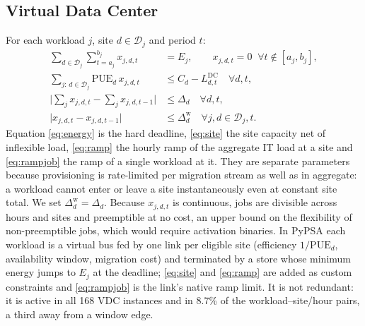 \documentclass[conference]{IEEEtran}
\begin{document}
\subsection{Virtual Data Center}
For each workload $j$, site $d\in\mathcal{D}_j$ and period $t$:
\begin{align}
\sum_{d\in\mathcal{D}_j} \sum_{t=a_j}^{b_j} x_{j,d,t} &= E_j, \qquad x_{j,d,t} = 0 \;\; \forall t \notin [a_j, b_j], \label{eq:energy}\\
\sum_{j:\, d\in\mathcal{D}_j} \mathrm{PUE}_d\, x_{j,d,t} &\le C_d - L^{\mathrm{DC}}_{d,t} \quad \forall d,t, \label{eq:site}\\
\Big| \sum_{j} x_{j,d,t} - \sum_{j} x_{j,d,t-1} \Big| &\le \Delta_d \quad \forall d,t, \label{eq:ramp}\\
\big| x_{j,d,t} - x_{j,d,t-1} \big| &\le \Delta^{\mathrm{w}}_d \quad \forall j, d\in\mathcal{D}_j, t. \label{eq:rampjob}
\end{align}
Equation \eqref{eq:energy} is the hard deadline, \eqref{eq:site} the site capacity net of inflexible load, \eqref{eq:ramp} the hourly ramp of the aggregate IT load at a site and \eqref{eq:rampjob} the ramp of a single workload at it. They are separate parameters because provisioning is rate-limited per migration stream as well as in aggregate: a workload cannot enter or leave a site instantaneously even at constant site total. We set $\Delta^{\mathrm{w}}_d = \Delta_d$. Because $x_{j,d,t}$ is continuous, jobs are divisible across hours and sites and preemptible at no cost, an upper bound on the flexibility of non-preemptible jobs, which would require activation binaries. In PyPSA each workload is a virtual bus fed by one link per eligible site (efficiency $1/\mathrm{PUE}_d$, availability window, migration cost) and terminated by a store whose minimum energy jumps to $E_j$ at the deadline; \eqref{eq:site} and \eqref{eq:ramp} are added as custom constraints and \eqref{eq:rampjob} is the link's native ramp limit. It is not redundant: it is active in all 168 VDC instances and in 8.7\% of the workload--site/hour pairs, a third away from a window edge.
\end{document}
